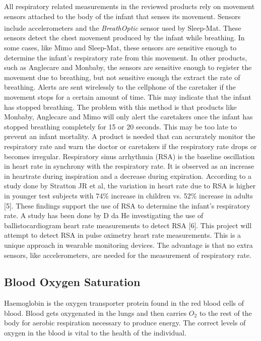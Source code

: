 All respiratory related measurements in the reviewed products rely on movement sensors attached to the body of the infant that senses its movement. Sensors include accelerometers and the \textit{BreathOptic}\textsuperscript{\texttrademark} sensor used by Sleep-Mat. These sensors detect the chest movement produced by the infant while breathing. In some cases, like Mimo and Sleep-Mat, these sensors are sensitive enough to determine the infant's respiratory rate from this movement. In other products, such as Anglecare and Monbaby, the sensors are sensitive enough to register the movement due to breathing, but not sensitive enough the extract the rate of breathing.
Alerts are sent wirelessly to the cellphone of the caretaker if the movement stops for a certain amount of time. This may indicate that the infant has stopped breathing. The problem with this method is that products like Monbaby, Anglecare and Mimo will only alert the caretakers once the infant has stopped breathing completely for 15 or 20 seconds. This may be too late to prevent an infant mortality. A product is needed that can accurately monitor the respiratory rate and warn the doctor or caretakers if the respiratory rate drops or becomes irregular.
Respiratory sinus arrhythmia (RSA) is the baseline oscillation in heart rate in synchrony with the respiratory rate. It is observed as an increase in heartrate during inspiration and a decrease during expiration. According to a study done by Stratton JR et al, the variation in heart rate due to RSA is higher in younger test subjects with 74\% increase in children vs. 52\% increase in adults [5]. These findings support the use of RSA to determine the infant's respiratory rate. A study has been done by D da He investigating the use of ballistocardiogram heart rate measurements to detect RSA [6]. This project will attempt to detect RSA in pulse oximetry heart rate measurements. This is a unique approach in wearable monitoring devices. The advantage is that no extra sensors, like accelerometers, are needed for the measurement of respiratory rate.

\subsection{Blood Oxygen Saturation}
Haemoglobin is the oxygen transporter protein found in the red blood cells of blood. Blood gets oxygenated in the lungs and then carries \(O_2\) to the rest of the body for aerobic respiration necessary to produce energy. The correct levels of oxygen in the blood is vital to the health of the individual.

